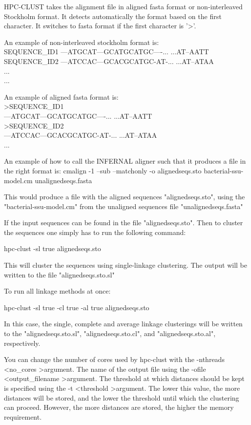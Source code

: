 \documentclass[10pt,a4paper]{article}
\begin{document}
HPC-CLUST takes the alignment file in aligned fasta format or non-interleaved Stockholm format.
It detects automatically the format based on the first character. It switches to fasta format if the first
character is '\textgreater'.

An example of non-interleaved stockholm format is:\\
SEQUENCE\_ID1      ---ATGCAT---GCATGCATGC----... ...AT--AATT\\
SEQUENCE\_ID2      ---ATCCAC---GCACGCATGC-AT-... ...AT--ATAA\\
...\\
...

An example of aligned fasta format is:\\
{\textgreater}SEQUENCE\_ID1\\
---ATGCAT---GCATGCATGC----... ...AT--AATT\\
{\textgreater}SEQUENCE\_ID2\\
---ATCCAC---GCACGCATGC-AT-... ...AT--ATAA\\
...


An example of how to call the INFERNAL aligner such that it produces a file in the
right format is:
cmalign -1 --sub --matchonly -o alignedseqs.sto bacterial-ssu-model.cm unalignedseqs.fasta

This would produce a file with the aligned sequences "alignedseqs.sto", using the
"bacterial-ssu-model.cm" from the unaligned sequences file "unalignedseqs.fasta"

If the input sequences can be found in the file "alignedseqs.sto". Then to cluster the
sequences one simply has to run the following command:

hpc-clust -sl true alignedseqs.sto

This will cluster the sequences using single-linkage clustering. The output will be written
to the file "alignedseqs.sto.sl"

To run all linkage methods at once:

hpc-clust -sl true -cl true -al true alignedseqs.sto

In this case, the single, complete and average linkage clusterings will be written to the
"alignedseqs.sto.sl", "alignedseqs.sto.cl", and "alignedseqs.sto.al", respectively.

You can change the number of cores used by hpc-clust with the -nthreads \textless no\_cores \textgreater argument.
The name of the output file using the -ofile \textless output\_filename \textgreater argument.
The threshold at which distances should be kept is specified using the -t \textless threshold \textgreater argument.
The lower this value, the more distances will be stored, and the lower the threshold until which
the clustering can proceed. However, the more distances are stored, the higher the memory 
requirement.
\end{document}
